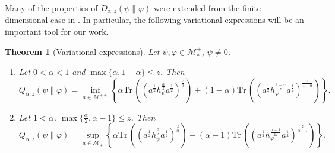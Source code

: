\documentclass[12pt]{article}
\newtheorem{theorem}{Theorem}[section]
\theoremstyle{definition}
\theoremstyle{remark}
\numberwithin{equation}{section}
\def\Me{\mathcal M}
\def \Tr{\mathrm{Tr}\,}
\begin{document}
Many of the  properties of $D_{\alpha,z}(\psi\|\varphi)$ 
were extended from the finite dimensional case in \cite{kato2023onrenyi}. In particular,
the following variational expressions will be an important tool for our work.

\begin{theorem}[Variational expressions]\label{thm:variational} Let $\psi,\varphi\in \Me_*^+$, $\psi\ne 0$. 
\begin{enumerate}
\item[(i)] Let $0<\alpha<1$ and $\max\{\alpha,1-\alpha\}\le z$. Then
\[
Q_{\alpha,z}(\psi\|\varphi)=\inf_{a\in \Me^{++}}\left\{\alpha
\Tr\left((a^{\frac12}h_\psi^{\frac{\alpha}{z}}a^{\frac12})^{\frac{z}{\alpha}}\right)+(1-\alpha)
\Tr\left((a^{\frac12}h_\varphi^{\frac{1-\alpha}{z}}a^{\frac12})^{\frac{z}{1-\alpha}}\right) \right\}.
\]

\item[(ii)] Let $1<\alpha$, $\max\{\frac{\alpha}{2},\alpha-1\}\le z$. Then
\[
Q_{\alpha,z}(\psi\|\varphi)=\sup_{a\in \Me_+} \left\{\alpha
\Tr\left((a^{\frac12}h_\psi^{\frac{\alpha}{z}}a^{\frac12})^{\frac{z}{\alpha}}\right)-(\alpha-1)
\Tr\left((a^{\frac12}h_\varphi^{\frac{\alpha-1}{2z}}a^{\frac12})^{\frac{z}{\alpha-1}}\right) \right\}.
\]

\end{enumerate}


\end{theorem}
\end{document}
